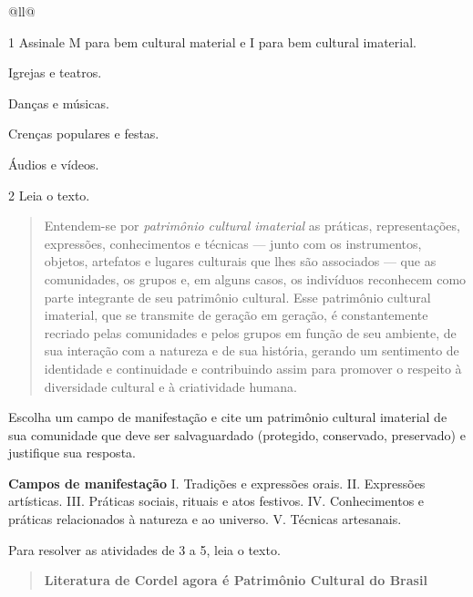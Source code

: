 \begin{itemize}
\begin{itemize}
\begin{escolha}[]{@{}ll@{}}

\num{1} Assinale M para bem cultural material e I para bem cultural imaterial.

\begin{boxlist}
\item Igrejas e teatros. 

\item Danças e músicas. 

\item Crenças populares e festas. 

\item Áudios e vídeos. 
\end{boxlist}

\num{2}  Leia o texto.

\begin{quote}
Entendem-se por \emph{patrimônio cultural imaterial} as práticas,
representações, expressões, conhecimentos e técnicas --- junto com os
instrumentos, objetos, artefatos e lugares culturais que lhes são
associados --- que as comunidades, os grupos e, em alguns casos, os
indivíduos reconhecem como parte integrante de seu patrimônio cultural.
Esse patrimônio cultural imaterial, que se transmite de geração em
geração, é constantemente recriado pelas comunidades e pelos grupos em função
de seu ambiente, de sua interação com a natureza e de sua história,
gerando um sentimento de identidade e continuidade e contribuindo assim
para promover o respeito à diversidade cultural e à criatividade humana.

\end{quote}

Escolha um campo de manifestação e cite um patrimônio cultural imaterial
de sua comunidade que deve ser salvaguardado (protegido, conservado,
preservado) e justifique sua resposta.

\textbf{Campos de manifestação}
I. Tradições e expressões orais.
II. Expressões artísticas.
III. Práticas sociais, rituais e atos festivos.
IV. Conhecimentos e práticas relacionados à natureza e ao universo.
V. Técnicas artesanais.


Para resolver as atividades de 3 a 5, leia o texto.

\begin{quote}
\textbf{Literatura de Cordel agora é Patrimônio Cultural do Brasil}


\end{quote}
\end{escolha}
\end{itemize}
\end{itemize}
